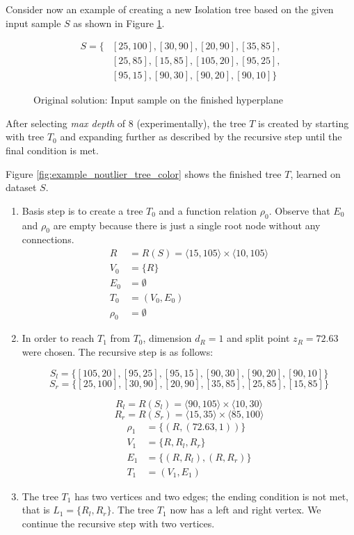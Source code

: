 \begin{example}
\label{example:original_tree_create}
Consider now an example of creating a new Isolation tree based on the given input sample $S$ as shown in Figure \ref{fig:example_noutlier_gnu}.

\begin{align*}
    S = \{&[25,100],[30,90],[20,90],[35,85],\\
    &[25,85],[15,85],[105,20],[95,25], \\
    &[95,15],[90,30],[90,20],[90,10]\}
\end{align*}


\begin{figure}[htbp]
\centering

\caption{Original solution: Input sample on the finished hyperplane}
\label{fig:example_noutlier_gnu}
\end{figure}

After selecting \emph{max depth} of 8 (experimentally), the tree $T$ is created by starting with tree $T_0$ and expanding further as described by the recursive step until the final condition is met.

Figure \ref{fig:example_noutlier_tree_color} shows the finished tree $T$, learned on dataset $S$.

\begin{enumerate}
    \item Basis step is to create a tree $T_0$ and a function relation $\rho_0$. 
    Observe that $E_0$ and $\rho_0$ are empty because there is just a single root node without any connections.
\begin{align*}
R &= R(S) = \langle 15, 105 \rangle \times \langle 10, 105 \rangle\\
V_0 &= \{R\}\\
E_0 &= \emptyset\\
T_0 &= (V_0, E_0)\\
\rho_0 &= \emptyset
\end{align*}    

\item In order to reach $T_1$ from $T_0$, dimension $d_R=1$ and split point $z_R = 72.63$ were chosen. The recursive step is as follows:

$$S_l = \{[105,20],[95,25],[95,15],[90,30],[90,20],[90,10]\}$$
$$S_r = \{[25,100],[30,90],[20,90],[35,85],[25,85],[15,85]\}$$

$$R_l = R(S_l) = \langle 90, 105 \rangle \times \langle 10, 30 \rangle$$
$$R_r = R(S_r) = \langle 15, 35 \rangle \times \langle 85, 100 \rangle$$
\begin{align*}
\rho_1 &= \{ (R, (72.63, 1))\}\\
V_1 &= \{R, R_l, R_r\}\\
E_1 &= \{(R,R_l), (R,R_r)\}\\
T_1 &= (V_1, E_1)
\end{align*}
\item The tree $T_1$ has two vertices and two edges; the ending condition is not met, that is $L_1 = \{R_l,R_r\}$. The tree $T_1$ now has a left and right vertex. We continue the recursive step with two vertices.


\end{enumerate}
\end{example}
